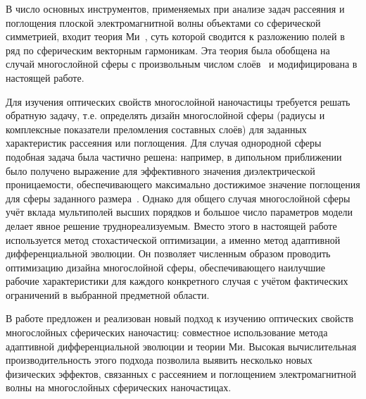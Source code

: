 {\methods} В число основных инструментов, применяемых при анализе задач
рассеяния и поглощения плоской электромагнитной волны объектами со
сферической симметрией, входит теория Ми~\cite{Mie-1908}, суть которой
сводится к разложению полей в ряд по сферическим векторным
гармоникам. Эта теория была обобщена на случай многослойной сферы с
произвольным числом слоёв~\cite{Yang-2003, Pena-scattnlay-2009} и
модифицирована в настоящей работе. %

Для изучения оптических свойств многослойной наночастицы требуется
решать обратную задачу, т.е. определять дизайн многослойной сферы
(радиусы и комплексные показатели преломления составных слоёв) для
заданных характеристик рассеяния или поглощения. Для случая однородной
сферы подобная задача была частично решена: например, в дипольном
приближении было получено выражение для эффективного значения
диэлектрической проницаемости, обеспечивающего максимально достижимое
значение поглощения для сферы заданного
размера~\cite{Grigoriev-2015}. Однако для общего случая многослойной
сферы учёт вклада мультиполей высших порядков и большое число
параметров модели делает явное решение труднореализуемым. Вместо этого
в настоящей работе используется метод стохастической оптимизации, а
именно метод адаптивной дифференциальной эволюции. Он позволяет
численным образом проводить оптимизацию дизайна многослойной сферы,
обеспечивающего наилучшие рабочие характеристики для каждого
конкретного случая с учётом фактических ограничений в выбранной
предметной области.

{\novelty} В работе предложен и реализован новый подход к изучению
оптических свойств многослойных сферических наночастиц: совместное
использование метода адаптивной дифференциальной эволюции и теории Ми.
Высокая вычислительная производительность этого подхода позволила
выявить несколько новых физических эффектов, связанных с рассеянием и
поглощением электромагнитной волны на многослойных сферических
наночастицах.

